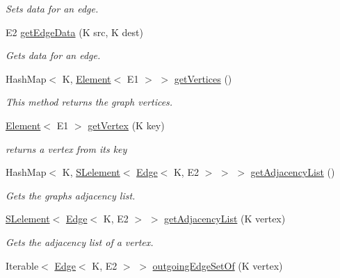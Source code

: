 \begin{DoxyCompactItemize}
\begin{DoxyCompactList}\small\item\em Sets data for an edge. \end{DoxyCompactList}\item 
E2 \hyperlink{classbridges_1_1base_1_1_graph_adj_list_a13cdc7ed89fb211f47e2b04da0b65561}{get\+Edge\+Data} (K src, K dest)
\begin{DoxyCompactList}\small\item\em Gets data for an edge. \end{DoxyCompactList}\item 
Hash\+Map$<$ K, \hyperlink{classbridges_1_1base_1_1_element}{Element}$<$ E1 $>$ $>$ \hyperlink{classbridges_1_1base_1_1_graph_adj_list_acd53b2393db0936ad5812997f67ee1ee}{get\+Vertices} ()
\begin{DoxyCompactList}\small\item\em This method returns the graph vertices. \end{DoxyCompactList}\item 
\hyperlink{classbridges_1_1base_1_1_element}{Element}$<$ E1 $>$ \hyperlink{classbridges_1_1base_1_1_graph_adj_list_aa19cd300a85b05352bdf58720310a112}{get\+Vertex} (K key)
\begin{DoxyCompactList}\small\item\em returns a vertex from its key \end{DoxyCompactList}\item 
Hash\+Map$<$ K, \hyperlink{classbridges_1_1base_1_1_s_lelement}{S\+Lelement}$<$ \hyperlink{classbridges_1_1base_1_1_edge}{Edge}$<$ K, E2 $>$ $>$ $>$ \hyperlink{classbridges_1_1base_1_1_graph_adj_list_a77771e356aa8bf44525be9ae01603989}{get\+Adjacency\+List} ()
\begin{DoxyCompactList}\small\item\em Gets the graph\textquotesingle{}s adjacency list. \end{DoxyCompactList}\item 
\hyperlink{classbridges_1_1base_1_1_s_lelement}{S\+Lelement}$<$ \hyperlink{classbridges_1_1base_1_1_edge}{Edge}$<$ K, E2 $>$ $>$ \hyperlink{classbridges_1_1base_1_1_graph_adj_list_aa8d25bc56b9a172999f0c62ee7e04b6f}{get\+Adjacency\+List} (K vertex)
\begin{DoxyCompactList}\small\item\em Gets the adjacency list of a vertex. \end{DoxyCompactList}\item 
Iterable$<$ \hyperlink{classbridges_1_1base_1_1_edge}{Edge}$<$ K, E2 $>$ $>$ \hyperlink{classbridges_1_1base_1_1_graph_adj_list_a084693f2f464b8f1d21d5ed2a864bf46}{outgoing\+Edge\+Set\+Of} (K vertex)

\end{DoxyCompactItemize}
